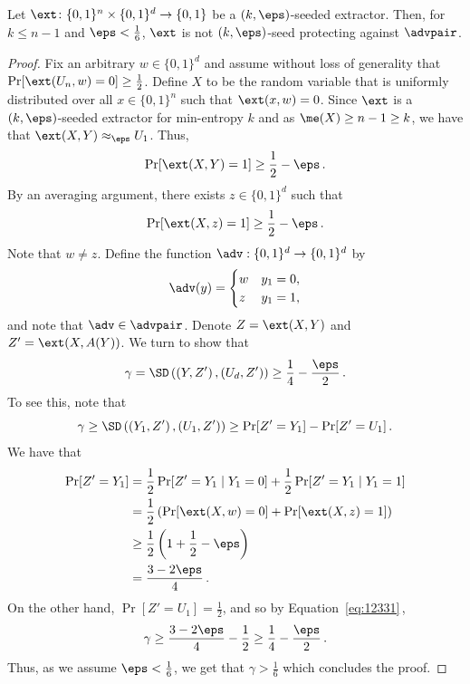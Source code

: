 \documentclass{toc}
\begin{document}
\begin{claim}\label{c:lower bound image two intro}
	Let $\ext \colon \{0,1\}^n \times \{0,1\}^d \to \{0,1\}$ be a $(k,\eps)$-seeded extractor. Then, for $k \le n-1$ and $\eps < \frac1{6}$, $\ext$ is not $(k,\eps)$-seed protecting against $\advpair$.
\end{claim}
\begin{proof}
	Fix an arbitrary $w \in \{0,1\}^d$ and assume without loss of generality that $\Pr[\ext(U_n,w) = 0] \ge \frac1{2}$. Define $X$ to be the random variable that is uniformly distributed over all $x \in \{0,1\}^n$ such that $\ext(x,w ) = 0$. Since $\ext$ is a 
%
$(k,\eps)$-seeded extractor   %
for min-entropy $k$ and as $\me(X) \ge n-1 \ge k$, we have that $\ext(X,Y) \approx_\eps U_1$. Thus,
	$$
	\Pr[\ext(X,Y) = 1] \ge \frac1{2} - \eps\,.
	$$
	By an averaging argument, there exists $z \in \{0,1\}^d$ such that
	$$
	\Pr[\ext(X,z) = 1] \ge \frac1{2} - \eps\,.
	$$
	Note that $w \neq z$. Define the function $\adv : \{0,1\}^d \to \{0,1\}^d$ by
	\begin{align*}
	\adv(y) = \begin{cases}
	w & y_1 = 0,\\
	z & y_1 = 1,
	\end{cases}
	\end{align*}
	and note that $\adv \in \advpair$. Denote $Z = \ext(X,Y)$ and $Z' = \ext(X,A(Y))$.	We turn to show that
	$$
	\gamma = \SD\left(\left(Y,Z'\right) , \left(U_d, Z'\right)\right) \ge \frac1{4} - \frac{\eps}{2}\,.
	$$
	To see this, note that
	\begin{equation}\label{eq:12331}
	\gamma \ge \SD\left(\left(Y_1, Z'\right) , \left(U_1,Z'\right)\right)
	\ge \Pr[Z' = Y_1] - \Pr[Z' = U_1]\,.
	\end{equation}
	We have that
	\begin{align*}
	\Pr[Z' = Y_1] &=
	\frac1{2} \Pr[Z' = Y_1 \mid Y_1 = 0] + \frac1{2} \Pr[Z' = Y_1 \mid Y_1 = 1] \\
	&= \frac1{2} \left(\Pr[\ext(X,w) = 0] + \Pr[\ext(X,z) = 1] \right) \\
	&\ge \frac1{2} \left(1 + \frac1{2} - \eps\right) \\
	&= \frac{3-2\eps}{4}\,.
	\end{align*}
	On the other hand, $\Pr[Z' = U_1] = \frac1{2}$, and so by Equation~\eqref{eq:12331}\,, $$
	\gamma \ge \frac{3-2\eps}{4} - \frac1{2} \ge \frac1{4} - \frac{\eps}{2}\,.
	$$
	Thus, as we assume $\eps < \frac1{6}$, we get that
	$\gamma > \frac1{6}$ which concludes the proof.
\end{proof}
\end{document}
